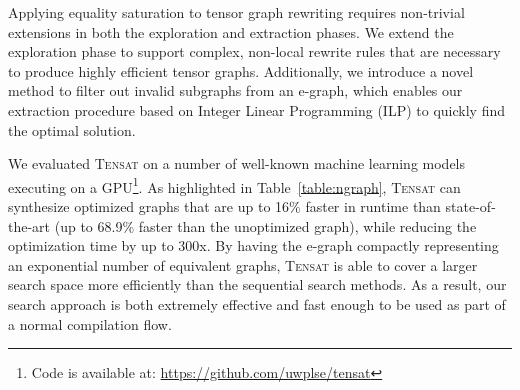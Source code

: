 \documentclass{article}
\newcommand{\ATTN}[1]{\textcolor{blue}{#1}}
\newcommand{\TODO}[1]{\textcolor{red}{#1}}
\newcommand{\CUT}[1]{\textcolor{yellow}{#1}}
\newcommand{\ourname}[0]{\textsc{Tensat}}
\begin{document}

Applying equality saturation to tensor graph rewriting requires non-trivial extensions in both the exploration and extraction phases.
We extend the exploration phase to support complex, non-local rewrite rules that are necessary to produce highly efficient tensor graphs. 
Additionally, we introduce a novel method to filter out invalid subgraphs from an e-graph,
which enables our extraction procedure based on Integer Linear Programming (ILP) to quickly find the optimal solution. 

We evaluated \ourname{} on a number of well-known machine learning models executing on a GPU\footnote{Code is available at: \url{https://github.com/uwplse/tensat}}.
As highlighted in Table~\ref{table:ngraph}, \ourname{} can synthesize optimized graphs that are up to 16\% faster in runtime than state-of-the-art \cite{taso} (up to 68.9\% faster than the unoptimized graph), while reducing the optimization time by up to 300x. 
By having the e-graph compactly representing an exponential number of equivalent graphs, \ourname{} is able to cover a larger search space more efficiently than the sequential search methods.
As a result, our search approach is both extremely effective and fast enough to be used as part of a normal compilation flow.
\end{document}
